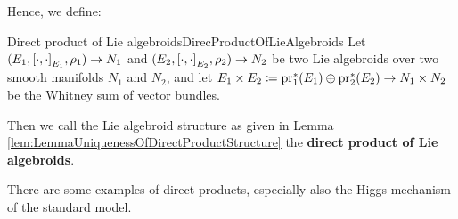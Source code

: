 %
%

Hence, we define:

\begin{definitions}{Direct product of Lie algebroids}{DirecProductOfLieAlgebroids}
Let $(E_1, \mleft[ \cdot, \cdot \mright]_{E_1}, \rho_1) \to N_1$ and $(E_2, \mleft[ \cdot, \cdot \mright]_{E_2}, \rho_2) \to N_2$ be two Lie algebroids over two smooth manifolds $N_1$ and $N_2$, and let $E_1 \times E_2 \coloneqq \mathrm{pr}_1^*\mleft( E_1 \mright) \oplus \mathrm{pr}_2^*\mleft( E_2 \mright) \to N_1 \times N_2$ be the Whitney sum of vector bundles.

Then we call the Lie algebroid structure as given in Lemma \ref{lem:LemmaUniquenessOfDirectProductStructure} the \textbf{direct product of Lie algebroids}.
\end{definitions}

There are some examples of direct products, especially also the Higgs mechanism of the standard model.


